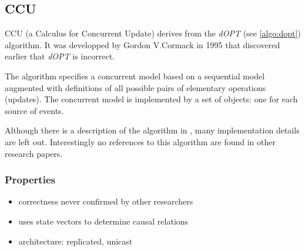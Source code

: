 \subsection{CCU}
\label{algo:ccu}

CCU (a Calculus for Concurrent Update) derives from the \emph{dOPT} (see \ref{algo:dopt}) algorithm. It was developped by Gordon V.Cormack in 1995 that discovered earlier \cite{cormack95a} that \emph{dOPT} is incorrect. 

The algorithm specifies a concurrent model based on a sequential model augmented with definitions of all possible pairs of elementary operations (updates). The concurrent model is implemented by a set of objects: one for each source of events.

Although there is a description of the algorithm in \cite{cormack95b}, many implementation details are left out. Interestingly no references to this algorithm are found in other research papers.

\subsubsection{Properties}
\begin{itemize}
 \item correctness never confirmed by other researchers
 \item uses state vectors to determine causal relations
 \item architecture: replicated, unicast
\end{itemize}
